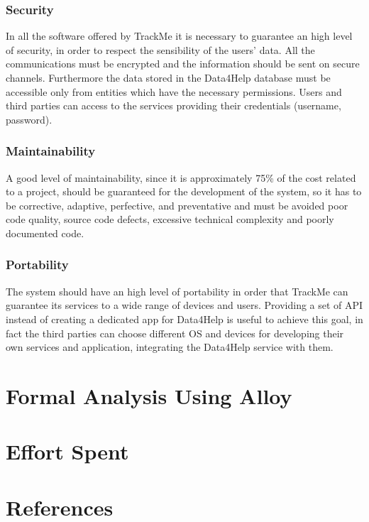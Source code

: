 \documentclass[a4paper]{article}
\begin{document}
    \subsubsection{Security}
    
    In all the software offered by TrackMe it is necessary to guarantee an high level of security, in order to respect the sensibility of the users' data.
    All the communications must be encrypted and the information should be sent on secure channels.
    Furthermore the data stored in the Data4Help database must be accessible only from entities which have the necessary permissions. 
    Users and third parties can access to the services providing their credentials (username, password). 
    
    \subsubsection{Maintainability}
    
    A good level of maintainability, since it is approximately 75\% of the cost related to a project, should be guaranteed for the development of the system, so it has to be corrective, adaptive, perfective, and preventative and
    must be avoided poor code quality, source code defects, excessive technical complexity and poorly documented code.
    
    \subsubsection{Portability}
    
    The system should have an high level of portability in order that TrackMe can guarantee its services to a wide range of devices and users.
    Providing a set of API instead of creating a dedicated app for Data4Help is useful to achieve this goal, in fact the third parties can choose different OS and devices for developing their own services and application, integrating the Data4Help service with them.
    \section{Formal Analysis Using Alloy}
    
    \section{Effort Spent}
    
    \section{References}
    
    
    
\end{document}
